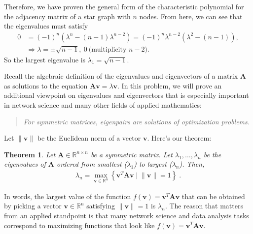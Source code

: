 \documentclass[11pt]{article}
\newtheorem{thm}{Theorem}
\begin{document}
 Therefore, we have proven the general form of the characteristic polynomial for the adjacency matrix of a star graph with $n$ nodes. From here, we can see that the eigenvalues must satisfy
 \begin{align*}
 	 0 &= (-1)^n \left(\lambda^{n} - (n-1)\lambda^{n-2}\right) =(-1)^n \lambda^{n-2}\left(\lambda^2 - (n-1) \right), \\ 
 &\Rightarrow \lambda = \pm \sqrt{n-1}, \ 0 \ \text{(multiplicity $n-2$)}.
	 \end{align*}
So the largest eigenvalue is $\lambda_1 = \sqrt{n-1}.$

\newpage

\begin{tcolorbox}[title = 4. Eigenpairs of symmetric matrices and optimization]
Recall the algebraic definition of the eigenvalues and eigenvectors of a matrix $\mathbf{A}$ as solutions to the equation $\mathbf{A}\mathbf{v} = \lambda \mathbf{v}$. 
In this problem, we will prove an additional viewpoint on eigenvalues and eigenvectors that is especially important in network science and many other fields of applied mathematics: 
\begin{quote}
    \emph{For symmetric matrices, eigenpairs are solutions of optimization problems.} 
\end{quote}
Let $\lVert\mathbf{v} \rVert$ be the Euclidean norm of a vector $\mathbf{v}$. 
Here's our theorem: 
\begin{thm} \label{thm:variational}
    Let $\mathbf{A} \in \mathbb{R}^{n\times n}$ be a symmetric matrix. 
    Let $\lambda_1,\ldots,\lambda_n$ be the eigenvalues of $\mathbf{A}$ ordered from smallest ($\lambda_1$) to largest ($\lambda_n$).  
    Then, 
    \begin{align*}
        \lambda_n = \max_{\mathbf{v} \in \mathbb{R}^n} \left\{\mathbf{v}^T\mathbf{A}\mathbf{v} \;\big|\; \lVert{\mathbf{v}}\rVert = 1\right\} \;.
    \end{align*}
\end{thm}
In words, the largest value of the function $f(\mathbf{v}) = \mathbf{v}^T\mathbf{A}\mathbf{v}$ that can be obtained by picking a vector $\mathbf{v} \in \mathbb{R}^n$ satisfying $\lVert \mathbf{v} \rVert = 1$ is $\lambda_n$. 
The reason that  matters from an applied standpoint is that many network science and data analysis tasks correspond to maximizing functions that look like $f(\mathbf{v}) = \mathbf{v}^T\mathbf{A}\mathbf{v}$.  


\end{tcolorbox}
\end{document}
